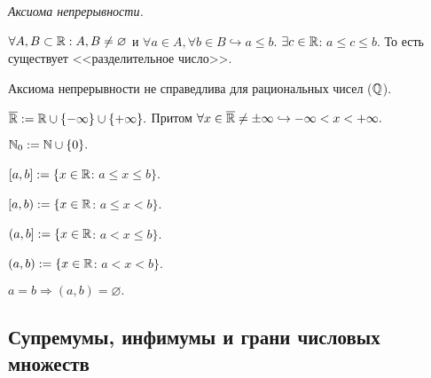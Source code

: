     \begin{definition}
        \textit{Аксиома непрерывности.} 
        
        $\forall A, B \subset \mathbb{R}: A, B \neq \varnothing$ и $\forall a \in A, \forall b \in B \hookrightarrow a \leq b.$ $\exists c \in \mathbb{R}$: $a \leq c \leq b.$ То есть существует <<разделительное число>>.
    \end{definition}

    \begin{note}
        Аксиома непрерывности не справедлива для рациональных чисел ($\mathbb{Q}$).
    \end{note}

    \begin{definition}
        $\overline{\mathbb{R}} := \mathbb{R} \cup \{ -\infty \} \cup \{ +\infty \}.$ Притом $\forall x \in \overline{\mathbb{R}} \neq \pm \infty \hookrightarrow -\infty < x < +\infty.$
    \end{definition}
    \begin{definition}
        $\mathbb{N}_{0} := \mathbb{N} \cup \{ 0 \}.$
    \end{definition}

    \begin{definition}
        $[a, b] := \{x \in \mathbb{R}$: $a \leq x \leq b \}.$
    \end{definition}
    \begin{definition}
        $[a, b) := \{x \in \mathbb{R}$: $a \leq x < b \}.$
    \end{definition}
    \begin{definition}
        $(a, b] := \{x \in \mathbb{R}$: $a < x \leq b \}.$
    \end{definition}
    
    \begin{definition}
        $(a, b) := \{x \in \mathbb{R}$: $a < x < b \}.$
    \end{definition}
    \begin{definition}
        $a = b \Rightarrow (a, b) = \varnothing .$
    \end{definition}

    \newpage
    \subsection{Супремумы, инфимумы и грани числовых множеств}

